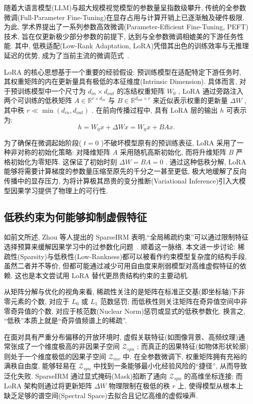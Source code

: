 \documentclass[a4paper,punct=banjiao,twoside]{ctexrep}
\theoremstyle{plain}
\theoremstyle{definition}
\theoremstyle{remark}
\begin{document}
随着大语言模型(LLM)与超大规模视觉模型的参数量呈指数级攀升, 传统的全参数微调(Full-Parameter Fine-Tuning)在显存占用与计算开销上已逐渐触及硬件极限. 为此, 学术界提出了一系列参数高效微调(Parameter-Efficient Fine-Tuning, PEFT)技术, 旨在仅更新极少部分参数的前提下, 达到与全参数微调相媲美的下游任务性能. 其中, 低秩适配(Low-Rank Adaptation, LoRA)凭借其出色的训练效率与无推理延迟的优势, 成为了当前主流的微调范式~\cite{hu2021lora}.

LoRA 的核心思想基于一个重要的经验假设: 预训练模型在适配特定下游任务时, 其权重矩阵的内在更新量具有极低的本征维度(Intrinsic Dimension). 具体而言, 对于预训练模型中一个尺寸为 $d_{in} \times d_{out}$ 的冻结权重矩阵 $W_0$ , LoRA 通过旁路注入两个可训练的低秩矩阵 $A \in \mathbb{R}^{r \times d_{in}}$ 与 $B \in \mathbb{R}^{d_{out} \times r}$ 来近似表示权重的更新量 $\Delta W$ , 其中秩 $r \ll \min(d_{in}, d_{out})$ . 在前向传播过程中, 具有 LoRA 层的输出 $h$ 可表示为:
\begin{equation}
    h = W_0 x + \Delta W x = W_0 x + B A x.
\end{equation}

为了确保在微调起始阶段( $t=0$ )不破坏模型原有的预训练表征, LoRA 采用了一种非对称的初始化策略: 对降维矩阵 $A$ 采用随机高斯初始化, 而将升维矩阵 $B$ 严格初始化为零矩阵. 这保证了初始时刻 $\Delta W = BA = 0$ . 通过这种低秩分解, LoRA 能够将需要计算梯度的参数量压缩至原先的千分之一甚至更低, 极大地缓解了反向传播中的显存压力, 为将计算极其昂贵的变分推断(Variational Inference)引入大模型因果学习提供了物理上的可行性.

\subsection{低秩约束为何能够抑制虚假特征}

如前文所述, Zhou 等人提出的 SparseIRM 表明,“全局稀疏约束”可以通过限制特征选择预算来缓解因果学习中的过参数化问题~\cite{zhou2022sparse}. 顺着这一脉络, 本文进一步讨论: 稀疏性(Sparsity)与低秩性(Low-Rankness)都可以被看作约束模型复杂度的结构手段, 虽然二者并不等价, 但都可能通过减少可用自由度来削弱模型对高维虚假特征的依赖. 这也是本文尝试用 LoRA 替代更昂贵结构约束的主要动机.

从矩阵分解与优化的视角来看, 稀疏性关注的是矩阵在标准正交基(即坐标轴)下非零元素的个数, 对应于 $L_0$ 或 $L_1$ 范数惩罚; 而低秩性则关注矩阵在奇异值空间中非零奇异值的个数, 对应于核范数(Nuclear Norm)惩罚或显式的低秩参数化. 换言之, “低秩”本质上就是“奇异值频谱上的稀疏”. 

在面对具有严重分布偏移的开放环境时, 虚假关联特征(如图像背景、高频纹理)通常张成了一个维度极高的非因果子空间 $\mathcal{Z}_{spu}$ ; 而真正的因果特征(如物体形状轮廓)则处于一个维度极低的因果子空间 $\mathcal{Z}_{inv}$ 中. 在全参数微调下, 权重矩阵拥有充裕的满秩自由度, 能够轻易在 $\mathcal{Z}_{spu}$ 中找到一条能够最小化经验风险的“捷径”, 从而导致泛化失败. SparseIRM 通过显式掩码(Mask)掐断了通向 $\mathcal{Z}_{spu}$ 的高维坐标连接; 而 LoRA 架构则通过将更新矩阵 $\Delta W$ 物理限制在极低的秩 $r$ 上, 使得模型从根本上缺乏足够的谱空间(Spectral Space)去拟合且记忆高维的虚假噪声.
\end{document}
